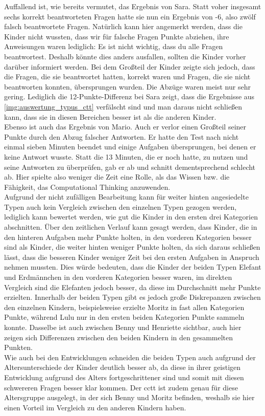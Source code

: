 	Auffallend ist, wie bereits vermutet, das Ergebnis von Sara. Statt voher insgesamt sechs korrekt beantworteten Fragen hatte sie nun ein Ergebnis von -6, also zwölf falsch beantwortete Fragen. Natürlich kann hier angemerkt werden, dass die Kinder nicht wussten, dass wir für falsche Fragen Punkte abziehen, ihre Anweisungen waren lediglich: \glqq Es ist nicht wichtig, dass du alle Fragen beantwortest\grqq. Deshalb könnte dies anders ausfallen, sollten die Kinder vorher darüber informiert werden. Bei dem Großteil der Kinder zeigte sich jedoch, dass die Fragen, die sie beantwortet hatten, korrekt waren und Fragen, die sie nicht beantworten konnten, übersprungen wurden. Die Abzüge waren meist nur sehr gering. Lediglich die 12-Punkte-Differenz bei Sara zeigt, dass die Ergebnisse aus \ref{img:auswertung_typus_ctt} verfälscht sind und man daraus nicht schließen kann, dass sie in diesen Bereichen besser ist als die anderen Kinder.\\
	Ebenso ist auch das Ergebnis von Mario. Auch er verlor einen Großteil seiner Punkte durch den Abzug falscher Antworten. Er hatte den Test nach nicht einmal sieben Minuten beendet und einige Aufgaben übersprungen, bei denen er keine Antwort wusste. Statt die 13 Minuten, die er noch hatte, zu nutzen und seine Antworten zu überprüfen, gab er ab und schnitt dementsprechend schlecht ab. Hier spielte also weniger die Zeit eine Rolle, als das Wissen bzw. die Fähigkeit, das Computational Thinking anzuwenden.\\
	Aufgrund der nicht zufälligen Bearbeitung kann für weiter hinten angesiedelte Typen auch kein Vergleich zwischen den einzelnen Typen gezogen werden, lediglich kann bewertet werden, wie gut die Kinder in den ersten drei Kategorien abschnitten. Über den zeitlichen Verlauf kann gesagt werden, dass Kinder, die in den hinteren Aufgaben mehr Punkte holten, in den vorderen Kategorien besser sind als Kinder, die weiter hinten weniger Punkte holten, da sich daraus schließen lässt, dass die besseren Kinder weniger Zeit bei den ersten Aufgaben in Anspruch nehmen mussten. Dies würde bedeuten, dass die Kinder der beiden Typen Elefant und Erdmännchen in den vorderen Kategorien besser waren, im direkten Vergleich sind die Elefanten jedoch besser, da diese im Durchschnitt mehr Punkte erzielten. Innerhalb der beiden Typen gibt es jedoch große Diskrepanzen zwischen den einzelnen Kindern, beispielsweise erzielte Moritz in fast allen Kategorien Punkte, während Lulu nur in den ersten beiden Kategorien Punkte sammeln konnte. Dasselbe ist auch zwischen Benny und Henriette sichtbar, auch hier zeigen sich Differenzen zwischen den beiden Kindern in den gesammelten Punkten.\\
	Wie auch bei den Entwicklungen schneiden die beiden Typen auch aufgrund der Altersunterschiede der Kinder deutlich besser ab, da diese in ihrer geistigen Entwicklung aufgrund des Alters fortgeschrittener sind und somit mit diesen schwereren Fragen besser klar kommen. Der \acrshort{cctt} ist zudem genau für diese Altersgruppe ausgelegt, in der sich Benny und Moritz befinden, weshalb sie hier einen Vorteil im Vergleich zu den anderen Kindern haben.